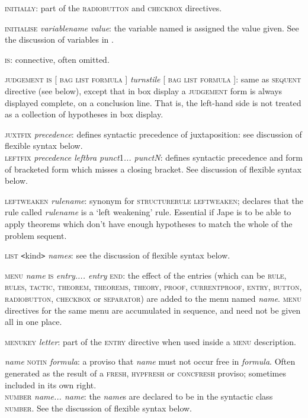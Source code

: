 \textsc{initially}: part of the \textsc{radiobutton} and \textsc{checkbox} directives.


\textsc{initialise} \textit{variablename} \textit{value}: the variable named is assigned the value given. See the discussion of variables in .


\textsc{is}: connective, often omitted.


\textsc{judgement is} [ \textsc{bag} {\textbar} \textsc{list} {\textbar} \textsc{formula} ] \textit{turnstile} [ \textsc{bag} {\textbar} \textsc{list} {\textbar} \textsc{formula} ]: same as \textsc{sequent} directive (see below), except that in box display a \textsc{judgement} form is always displayed complete, on a conclusion line. That is, the left-hand side is not treated as a collection of hypotheses in box display.


\textsc{juxtfix} \textit{precedence}: defines syntactic precedence of juxtaposition: see discussion of flexible syntax below.\\
\textsc{leftfix} \textit{precedence leftbra punct}1\textit{... punctN}: defines syntactic precedence and form of bracketed form which misses a closing bracket. See discussion of flexible syntax below.


\textsc{leftweaken} \textit{rulename}: synonym for \textsc{structurerule} \textsc{leftweaken}; declares that the rule called \textit{rulename} is a `left weakening' rule. Essential if Jape is to be able to apply theorems which don't have enough hypotheses to match the whole of the problem sequent.


\textsc{list \texttt{<}}kind\textsc{\texttt{>}} \textit{names}: see the discussion of flexible syntax below.


\textsc{menu} \textit{name} \textsc{is} \textit{entry.... entry} \textsc{end}: the effect of the entries (which can be \textsc{rule, rules, tactic, theorem, theorems, theory, proof, currentproof, entry, button, radiobutton, checkbox} or \textsc{separator)} are added to the menu named \textit{name}. \textsc{menu} directives for the same menu are accumulated in sequence, and need not be given all in one place.


\textsc{menukey} \textit{letter}: part of the \textsc{entry} directive when used inside a \textsc{menu} description.


\textit{name} \textsc{notin} \textit{formula}: a proviso that \textit{name} must not occur free in \textit{formula}. Often generated as the result of a \textsc{fresh, hypfresh} or \textsc{concfresh} proviso; sometimes included in its own right.\\
\textsc{number} \textit{name... name}: the \textit{name}s are declared to be in the syntactic class \textsc{number}. See the discussion of flexible syntax below.


